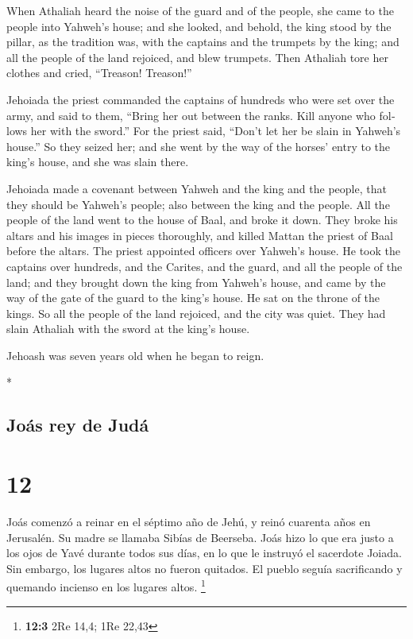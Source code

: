 \begin{paracol}{2}
\begin{otherlanguage}{english}
 When Athaliah heard the noise of the guard and of the
people, she came to the people into Yahweh's house;  and
she looked, and behold, the king stood by the pillar, as the tradition
was, with the captains and the trumpets by the king; and all the people
of the land rejoiced, and blew trumpets. Then Athaliah tore her clothes
and cried, ``Treason! Treason!''

 Jehoiada the priest commanded the captains of hundreds
who were set over the army, and said to them, ``Bring her out between
the ranks. Kill anyone who follows her with the sword.'' For the priest
said, ``Don't let her be slain in Yahweh's house.''  So
they seized her; and she went by the way of the horses' entry to the
king's house, and she was slain there.

 Jehoiada made a covenant between Yahweh and the king and
the people, that they should be Yahweh's people; also between the king
and the people.  All the people of the land went to the
house of Baal, and broke it down. They broke his altars and his images
in pieces thoroughly, and killed Mattan the priest of Baal before the
altars. The priest appointed officers over Yahweh's house.
 He took the captains over hundreds, and the Carites, and
the guard, and all the people of the land; and they brought down the
king from Yahweh's house, and came by the way of the gate of the guard
to the king's house. He sat on the throne of the kings. 
So all the people of the land rejoiced, and the city was quiet. They had
slain Athaliah with the sword at the king's house.

 Jehoash was seven years old when he began to reign.

\end{otherlanguage}

\switchcolumn[0]*

\hypertarget{jouxe1s-rey-de-juduxe1}{%
\subsection{Joás rey de Judá}\label{jouxe1s-rey-de-juduxe1}}

\hypertarget{section-22}{%
\section{12}\label{section-22}}

 Joás comenzó a reinar en el séptimo año de Jehú, y reinó
cuarenta años en Jerusalén. Su madre se llamaba Sibías de Beerseba.
 Joás hizo lo que era justo a los ojos de Yavé durante
todos sus días, en lo que le instruyó el sacerdote Joiada.
 Sin embargo, los lugares altos no fueron quitados. El
pueblo seguía sacrificando y quemando incienso en los lugares altos.
\footnote{\textbf{12:3} 2Re 14,4; 1Re 22,43}


\end{paracol}
